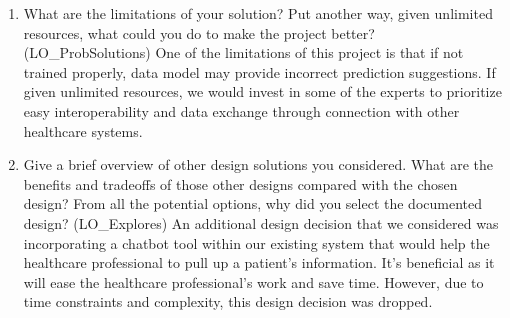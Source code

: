 \documentclass[12pt, titlepage]{article}
\begin{document}
\begin{enumerate}
  \item What are the limitations of your solution?  Put another way, given
  unlimited resources, what could you do to make the project better? (LO\_ProbSolutions)
  One of the limitations of this project is that if not trained properly, data model may provide incorrect prediction suggestions. If given unlimited resources, we would invest in some of the experts to prioritize easy interoperability and data exchange through connection with other healthcare systems. 

  \item Give a brief overview of other design solutions you considered.  What
  are the benefits and tradeoffs of those other designs compared with the chosen
  design?  From all the potential options, why did you select the documented design?
  (LO\_Explores)
  An additional design decision that we considered was incorporating a chatbot tool within our existing system that would help the healthcare professional to pull up a patient's information. It's beneficial as it will ease the healthcare professional's work and save time. However, due to time constraints and complexity, this design decision was dropped.  

\end{enumerate}
\end{document}
